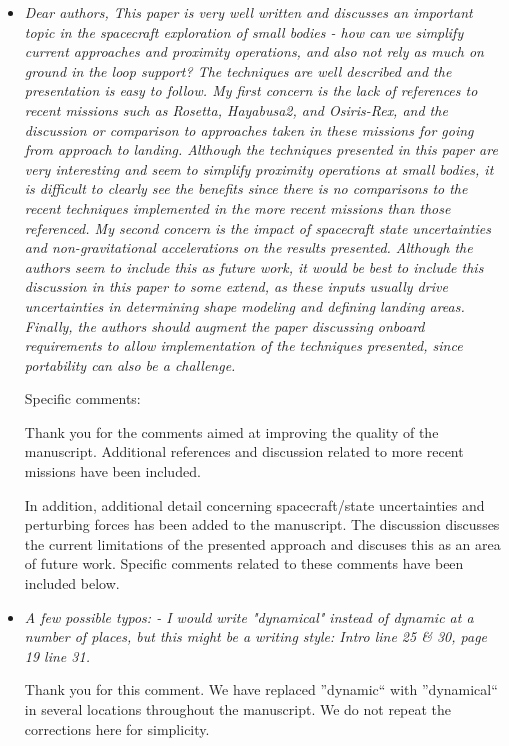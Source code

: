 \documentclass[11pt]{article}
\newcommand{\comment}[1]{\item \itshape #1 \normalfont}
\begin{document}
\begin{itemize}\setlength{\itemsep}{2\parsep}

\comment{    Dear authors,
This paper is very well written and discusses an important topic in the spacecraft exploration of small bodies - how can we simplify current approaches and proximity operations, and also not rely as much on ground in the loop support? The techniques are well described and the presentation is easy to follow.
My first concern is the lack of references to recent missions such as Rosetta, Hayabusa2, and Osiris-Rex, and the discussion or comparison to approaches taken in these missions for going from approach to landing. 
Although the techniques presented in this paper are very interesting and seem to simplify proximity operations at small bodies, it is difficult to clearly see the benefits since there is no comparisons to the recent techniques implemented in the more recent missions than those referenced.
My second concern is the impact of spacecraft state uncertainties and non-gravitational accelerations on the results presented.
Although the authors seem to include this as future work, it would be best to include this discussion in this paper to some extend, as these inputs usually drive uncertainties in determining shape modeling and defining landing areas.  
Finally, the authors should augment the paper discussing onboard requirements to allow implementation of the techniques presented, since portability can also be a challenge.

Specific comments:
}

Thank you for the comments aimed at improving the quality of the manuscript. 
Additional references and discussion related to more recent missions have been included.

In addition, additional detail concerning spacecraft/state uncertainties and perturbing forces has been added to the manuscript.
The discussion discusses the current limitations of the presented approach and discuses this as an area of future work.
Specific comments related to these comments have been included below.

\comment{A few possible typos:
- I would write "dynamical" instead of dynamic at a number of places, but this might be a writing style: Intro line 25 \& 30, page 19 line 31.
}

Thank you for this comment. 
We have replaced ''dynamic`` with ''dynamical`` in several locations throughout the manuscript.
We do not repeat the corrections here for simplicity.


\end{itemize}
\end{document}
